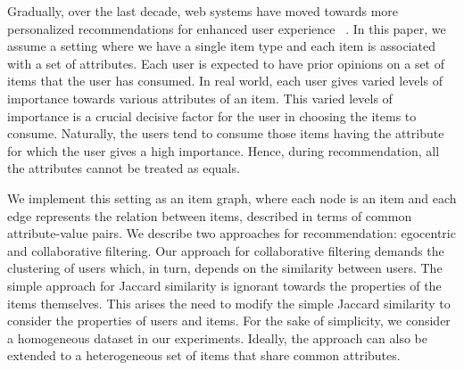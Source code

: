 \documentclass{acm_proc_article-sp}
\begin{document}
Gradually, over the last decade, web systems have moved towards more personalized recommendations for enhanced user experience ~\cite{durao, fabian}. In this paper, we assume a setting where we have a single item type and each item is associated with a set of attributes. Each user is expected to have prior opinions on a set of items that the user has consumed. In real world, each user gives varied levels of importance towards various attributes of an item. This varied levels of importance is a crucial decisive factor for the user in choosing the items to consume. Naturally, the users tend to consume those items having the attribute for which the user gives a high importance. Hence, during recommendation, all the attributes cannot be treated as equals.

We implement this setting as an item graph, where each node is an item and each edge represents the relation between items, described in terms of common attribute-value pairs. We describe two approaches for recommendation: egocentric and collaborative filtering. Our approach for collaborative filtering demands the clustering of users which, in turn, depends on the similarity between users. The simple approach for Jaccard similarity is ignorant towards the properties of the items themselves. This arises the need to modify the simple Jaccard similarity to consider the properties of users and items. For the sake of simplicity, we consider a homogeneous dataset in our experiments. Ideally, the approach can also be extended to a heterogeneous set of items that share common attributes.




\end{document}
